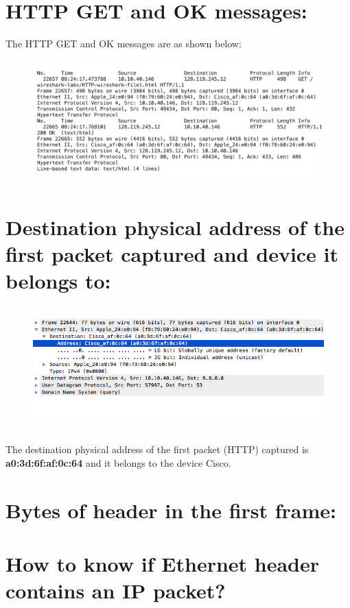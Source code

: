 \documentclass[]{report}
\begin{document}
\section{HTTP GET and OK messages:}
The HTTP GET and OK messages are as shown below:
\begin{figure}[H]
	\vspace{0pt}
	\includegraphics[height = 135pt, keepaspectratio]{Snapshots/q10.png}
\end{figure}

\section{Destination physical address of the first packet captured and device it belongs to:}
\begin{figure}[H]
	\vspace{0pt}
	\includegraphics[height = 135pt, keepaspectratio]{Snapshots/q11.png}
\end{figure}
The destination physical address of the first packet (HTTP) captured is \textbf{a0:3d:6f:af:0c:64} and it belongs to the device Cisco.

\section{Bytes of header in the first frame:}


\section{How to know if Ethernet header contains an IP packet?}
\end{document}
